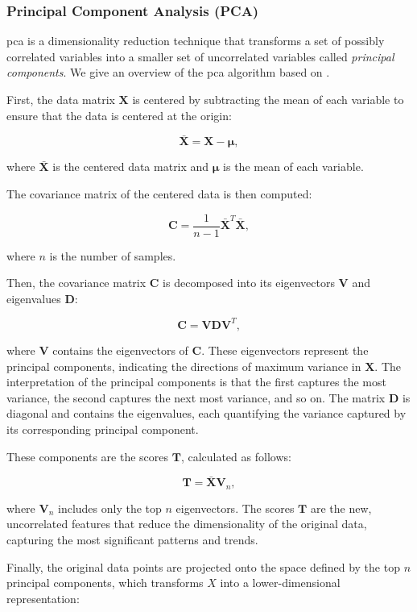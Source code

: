\subsubsection{Principal Component Analysis (PCA)}\label{subsec:pca}
\gls{pca} is a dimensionality reduction technique that transforms a set of possibly correlated variables into a smaller set of uncorrelated variables called \textit{principal components}.
We give an overview of the \gls{pca} algorithm based on \citet{James2023AnIS}.

First, the data matrix $\mathbf{X}$ is centered by subtracting the mean of each variable to ensure that the data is centered at the origin:

$$
\mathbf{\bar{X}} = \mathbf{X} - \mathbf{\mu},
$$

where $\mathbf{\bar{X}}$ is the centered data matrix and $\mathbf{\mu}$ is the mean of each variable.

The covariance matrix of the centered data is then computed:

$$
\mathbf{C} = \frac{1}{n-1} \mathbf{\bar{X}}^T \mathbf{\bar{X}},
$$

where $n$ is the number of samples.

Then, the covariance matrix $\mathbf{C}$ is decomposed into its eigenvectors $\mathbf{V}$ and eigenvalues $\mathbf{D}$:

$$
\mathbf{C} = \mathbf{V} \mathbf{D} \mathbf{V}^T,
$$

where $\mathbf{V}$ contains the eigenvectors of $\mathbf{C}$.
These eigenvectors represent the principal components, indicating the directions of maximum variance in $\mathbf{X}$.
The interpretation of the principal components is that the first captures the most variance, the second captures the next most variance, and so on.
The matrix $\mathbf{D}$ is diagonal and contains the eigenvalues, each quantifying the variance captured by its corresponding principal component.

These components are the scores $\mathbf{T}$, calculated as follows:

$$
\mathbf{T} = \mathbf{\bar{X}} \mathbf{V}_n,
$$

where $\mathbf{V}_n$ includes only the top $n$ eigenvectors.
The scores $\mathbf{T}$ are the new, uncorrelated features that reduce the dimensionality of the original data, capturing the most significant patterns and trends.

Finally, the original data points are projected onto the space defined by the top $n$ principal components, which transforms $X$ into a lower-dimensional representation:


